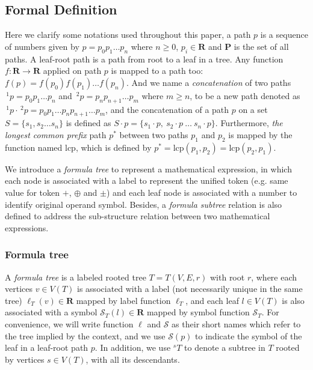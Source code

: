 \documentclass{acm_proc_article-sp}
\begin{document}
\subsection{Formal Definition}
Here we clarify some notations used throughout this paper, a path $p$ is a sequence of numbers given by $p = p_0 p_1 \ldots p_n$ where $n\ge0$, $p_i \in \mathbf{R}$ and $\mathbf{P}$ is the set of all paths.
A leaf-root path is a path from root to a leaf in a tree.
Any function $f: \mathbf{R} \rightarrow \mathbf{R}$ applied on path $p$ is mapped to a path too: $f(p)=f(p_0)f(p_1) \ldots f(p_n)$.
And we name  a \textit{concatenation} of two paths $\,^1p = p_0p_1 \ldots p_n$ and $\,^2p = p_np_{n+1} \ldots p_m$ where $m \ge n$, to be a new path denoted as $\,^1p \cdot \,^2p = p_0p_1 \ldots p_n p_{n+1} \ldots p_m$,
and the concatenation of a path $p$ on a set $S = \{ s_1, s_2 \ldots s_n \}$ is defined as $S \cdot p = \{ s_1\cdot p,\  s_2\cdot p \ \ldots \ s_n\cdot p \}$.
Furthermore, \textit{the longest common prefix} path $p^*$ between two paths $p_1$ and $p_2$ is mapped by the function named $\mathrm{lcp}$, which is defined by $p^* = \mathrm{lcp}(p_1, p_2) = \mathrm{lcp}(p_2, p_1)$.

We introduce a \textit{formula tree} to represent a mathematical expression, in which each node is associated with a label to represent the unified token (e.g. same value for token $+$, $\oplus$ and $\pm$) and each leaf node is associated with a number to identify original operand symbol. 
Besides, a \textit{formula subtree} relation is also defined to address the sub-structure relation between two mathematical expressions.

\subsubsection{Formula tree}
A \textit{formula tree} is a labeled rooted tree $T = T(V,E,r)$ with root $r$, where each vertices $v \in V(T)$ is associated with a label (not necessarily unique in the same tree) $\ell_T(v) \in \mathbf{R}$ mapped by label function $\ell_T$,
and each leaf $l \in V(T)$ is also associated with a symbol $\mathcal{S}_T(l) \in \mathbf{R}$ mapped by symbol function $\mathcal{S}_T$. 
For convenience, we will write function $\ell$ and $\mathcal{S}$ as their short names which refer to the tree implied by the context, and we use $\mathcal{S}(p)$ to indicate the symbol of the leaf in a leaf-root path $p$.
In addition, we use $^s T$ to denote a subtree in $T$ rooted by vertices $s \in V(T)$, with all its descendants.
\end{document}
